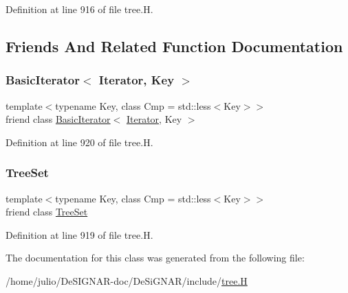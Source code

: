 Definition at line 916 of file tree.\+H.



\subsection{Friends And Related Function Documentation}
\mbox{\label{class_designar_1_1_tree_set_1_1_iterator_a0b375a570add16b09037ce1773f0ddbb}} 
\subsubsection{\texorpdfstring{Basic\+Iterator$<$ Iterator, Key $>$}{BasicIterator< Iterator, Key >}}
{\footnotesize\ttfamily template$<$typename Key, class Cmp = std\+::less$<$\+Key$>$$>$ \\
friend class \hyperlink{class_designar_1_1_basic_iterator}{Basic\+Iterator}$<$ \hyperlink{class_designar_1_1_tree_set_1_1_iterator}{Iterator}, Key $>$\hspace{0.3cm}{\ttfamily [friend]}}



Definition at line 920 of file tree.\+H.

\mbox{\label{class_designar_1_1_tree_set_1_1_iterator_a7caa42294700d2a60905ec3458a7cd8a}} 
\subsubsection{\texorpdfstring{Tree\+Set}{TreeSet}}
{\footnotesize\ttfamily template$<$typename Key, class Cmp = std\+::less$<$\+Key$>$$>$ \\
friend class \hyperlink{class_designar_1_1_tree_set}{Tree\+Set}\hspace{0.3cm}{\ttfamily [friend]}}



Definition at line 919 of file tree.\+H.



The documentation for this class was generated from the following file\+:\begin{DoxyCompactItemize}
\item 
/home/julio/\+De\+S\+I\+G\+N\+A\+R-\/doc/\+De\+Si\+G\+N\+A\+R/include/\hyperlink{tree_8_h}{tree.\+H}\end{DoxyCompactItemize}
